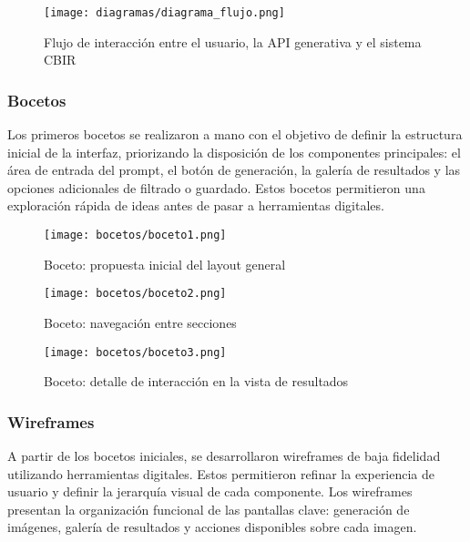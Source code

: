 \begin{figure}[H]
    \centering
    \texttt{[image: diagramas/diagrama\_flujo.png]}
    \caption{Flujo de interacción entre el usuario, la API generativa y el sistema CBIR}
    \label{fig:flujo-interaccion}
\end{figure}

\subsubsection{Bocetos}

Los primeros bocetos se realizaron a mano con el objetivo de definir la estructura inicial de la interfaz, priorizando la disposición de los componentes principales: el área de entrada del prompt, el botón de generación, la galería de resultados y las opciones adicionales de filtrado o guardado. Estos bocetos permitieron una exploración rápida de ideas antes de pasar a herramientas digitales.

\begin{figure}[H]
    \centering
    \texttt{[image: bocetos/boceto1.png]}
    \caption{Boceto: propuesta inicial del layout general}
    \label{fig:boceto1}
\end{figure}

\begin{figure}[H]
    \centering
    \texttt{[image: bocetos/boceto2.png]}
    \caption{Boceto: navegación entre secciones}
    \label{fig:boceto2}
\end{figure}

\begin{figure}[H]
    \centering
    \texttt{[image: bocetos/boceto3.png]}
    \caption{Boceto: detalle de interacción en la vista de resultados}
    \label{fig:boceto3}
\end{figure}

\subsubsection{Wireframes}

A partir de los bocetos iniciales, se desarrollaron wireframes de baja fidelidad utilizando herramientas digitales. Estos permitieron refinar la experiencia de usuario y definir la jerarquía visual de cada componente. Los wireframes presentan la organización funcional de las pantallas clave: generación de imágenes, galería de resultados y acciones disponibles sobre cada imagen.

